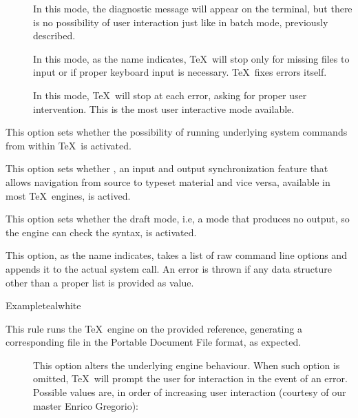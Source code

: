 \begin{description}
\begin{description}
\begin{description}
\item[] In this mode, the diagnostic message will appear on the terminal, but there is no possibility of user interaction just like in batch mode, previously described.

\item[] In this mode, as the name indicates, \TeX\ will stop only for missing files to input or if proper keyboard input is necessary. \TeX\ fixes errors itself.

\item[] In this mode, \TeX\ will stop at each error, asking for proper user intervention. This is the most user interactive mode available.
\end{description}

\item[\rpsbox{shell}] This option sets whether the possibility of running underlying system commands from within \TeX\ is activated.

\item[\rpsbox{synctex}] This option sets whether , an input and output synchronization feature that allows navigation from source to typeset material and vice versa, available in most \TeX\ engines, is actived.

\item[\rpsbox{draft}] This option sets whether the draft mode, i.e, a mode that produces no output, so the engine can check the syntax, is activated.

\item[\abox{options}] This option, as the name indicates, takes a list of raw command line options and appends it to the actual system call. An error is thrown if any data structure other than a proper list is provided as value.
\end{description}

\begin{codebox}{Example}{teal}{\icnote}{white}
\end{codebox}

\item[\rulebox{pdftex}{Marco Daniel, Paulo Cereda}] This rule runs the  \TeX\ engine on the provided  reference, generating a corresponding file in the Portable Document File format, as expected.

\begin{description}
\item[] This option alters the underlying engine behaviour. When such option is omitted, \TeX\ will prompt the user for interaction in the event of an error. Possible values are, in order of increasing user interaction (courtesy of our master Enrico Gregorio):


\end{description}
\end{description}

